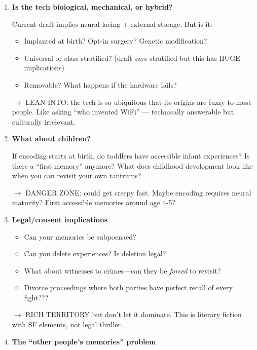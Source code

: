 \documentclass[11pt,letterpaper]{article}
\begin{document}
\begin{enumerate}[leftmargin=*]
    \item \textbf{Is the tech biological, mechanical, or hybrid?}
    
    Current draft implies neural lacing + external storage. But is it:
    \begin{itemize}
        \item Implanted at birth? Opt-in surgery? Genetic modification?
        \item Universal or class-stratified? (draft says stratified but this has HUGE implications)
        \item Removable? What happens if the hardware fails?
    \end{itemize}
    
    \textcolor{ideagreen}{$\rightarrow$ LEAN INTO: the tech is so ubiquitous that its origins are fuzzy to most people. Like asking ``who invented WiFi'' --- technically answerable but culturally irrelevant.}
    
    \item \textbf{What about children?}
    
    If encoding starts at birth, do toddlers have accessible infant experiences? Is there a ``first memory'' anymore? What does childhood development look like when you can revisit your own tantrums?
    
    \textcolor{warnorange}{$\rightarrow$ DANGER ZONE: could get creepy fast. Maybe encoding requires neural maturity? First accessible memories around age 4-5?}
    
    \item \textbf{Legal/consent implications}
    
    \begin{itemize}
        \item Can your memories be subpoenaed?
        \item Can you delete experiences? Is deletion legal?
        \item What about witnesses to crimes---can they be \textit{forced} to revisit?
        \item Divorce proceedings where both parties have perfect recall of every fight???
    \end{itemize}
    
    \textcolor{ideagreen}{$\rightarrow$ RICH TERRITORY but don't let it dominate. This is literary fiction with SF elements, not legal thriller.}
    
    \item \textbf{The ``other people's memories'' problem}
    

\end{enumerate}
\end{document}
